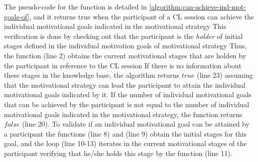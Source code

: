 The pseudo-code for the function  is detailed in \autoref{algorithm:can-achieve-ind-mot-goals-of}, and it returns true when the participant  of a CL session  can achieve the individual motivational goals indicated in the motivational strategy 
This verification is done by checking out that the participant  is the \emph{holder} of initial stages defined in the individual motivation goals of motivational strategy 
Thus, the function  (line 2) obtains the current motivational stages that are holden by the participant  in reference to the CL session 
If there is no information about these stages in the knowledge base, the algorithm returns $true$ (line 23) assuming that the motivational strategy  can lead the participant  to attain the individual motivational goals indicated by it. 
If the number of individual motivational goals  that can be achieved by the participant  is not equal to the number of individual motivational goals indicated in the motivational strategy, the function returns $false$ (line 20).
To validate if an individual motivational goal  can be attained by a participant  the functions  (line 8) and  (line 9) obtain the initial stages for this goal, and the loop  (line 10-13) iterates in the current motivational stages of the participant  verifying that he/she holds this stage by the function  (line 11).

